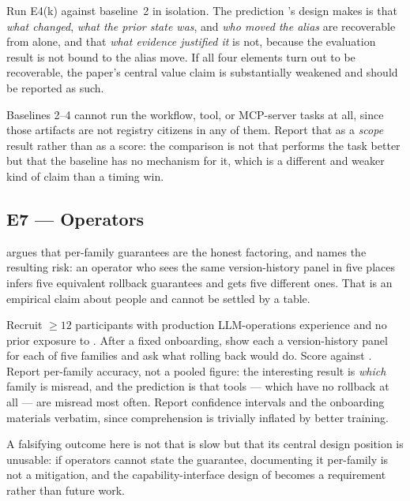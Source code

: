  Run E4(k) against baseline~2 in
isolation. The prediction \sys's design makes is that \emph{what changed}, \emph{what
the prior state was}, and \emph{who moved the alias} are recoverable from
\mlflow{} alone, and that \emph{what evidence justified it} is not, because the
evaluation result is not bound to the alias move. If all four elements turn out to
be recoverable, the paper's central value claim is substantially weakened and
should be reported as such.

 Baselines 2--4 cannot run the workflow,
tool, or MCP-server tasks at all, since those artifacts are not registry citizens
in any of them. Report that as a \emph{scope} result rather than as a score: the
comparison is not that \sys performs the task better but that the baseline has no
mechanism for it, which is a different and weaker kind of claim than a timing win.

\subsection{E7 --- Operators}

 argues that per-family guarantees are the honest factoring,
and  names the resulting risk: an operator who sees the same
version-history panel in five places infers five equivalent rollback guarantees and
gets five different ones. That is an empirical claim about people and cannot be
settled by a table.

 Recruit $\geq 12$ participants with
production LLM-operations experience and no prior exposure to \sys. After a fixed
onboarding, show each a version-history panel for each of five families and ask
what rolling back would do. Score against . Report per-family
accuracy, not a pooled figure: the interesting result is \emph{which} family is
misread, and the prediction is that tools --- which have no rollback at all --- are
misread most often. Report confidence intervals and the onboarding materials
verbatim, since comprehension is trivially inflated by better training.

A falsifying outcome here is not that \sys is slow but that its central design
position is unusable: if operators cannot state the guarantee, documenting it
per-family is not a mitigation, and the capability-interface design of
 becomes a requirement rather than future work.


